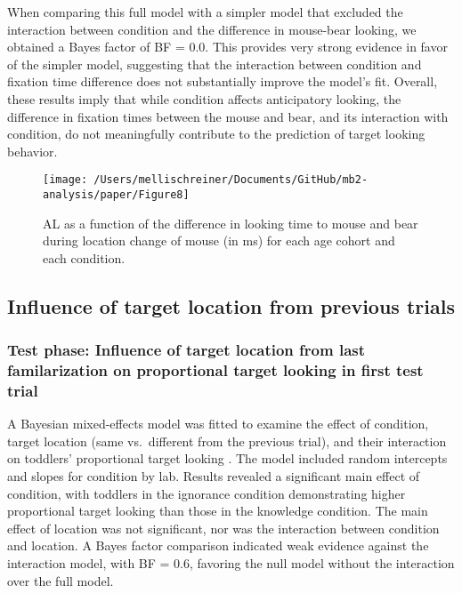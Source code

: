 \documentclass[
  man, donotrepeattitle,floatsintext]{apa6}
\begin{document}
When comparing this full model with a simpler model that excluded the interaction between condition and the difference in mouse-bear looking, we obtained a Bayes factor of BF = 0.0. This provides very strong evidence in favor of the simpler model, suggesting that the interaction between condition and fixation time difference does not substantially improve the model's fit. Overall, these results imply that while condition affects anticipatory looking, the difference in fixation times between the mouse and bear, and its interaction with condition, do not meaningfully contribute to the prediction of target looking behavior.

\begin{figure}

{\centering \texttt{[image: /Users/mellischreiner/Documents/GitHub/mb2-analysis/paper/Figure8]} 

}

\caption{AL as a function of the difference in looking time to mouse and bear during location change of mouse (in ms) for each age cohort and each condition.}\label{fig:fig10}
\end{figure}

\subsection{Influence of target location from previous trials}\label{influence-of-target-location-from-previous-trials}

\subsubsection{Test phase: Influence of target location from last familarization on proportional target looking in first test trial}\label{test-phase-influence-of-target-location-from-last-familarization-on-proportional-target-looking-in-first-test-trial}

A Bayesian mixed-effects model was fitted to examine the effect of condition, target location (same vs.~different from the previous trial), and their interaction on toddlers' proportional target looking . The model included random intercepts and slopes for condition by lab. Results revealed a significant main effect of condition, with toddlers in the ignorance condition demonstrating higher proportional target looking than those in the knowledge condition. The main effect of location was not significant, nor was the interaction between condition and location. A Bayes factor comparison indicated weak evidence against the interaction model, with
BF = 0.6, favoring the null model without the interaction over the full model.
\end{document}
